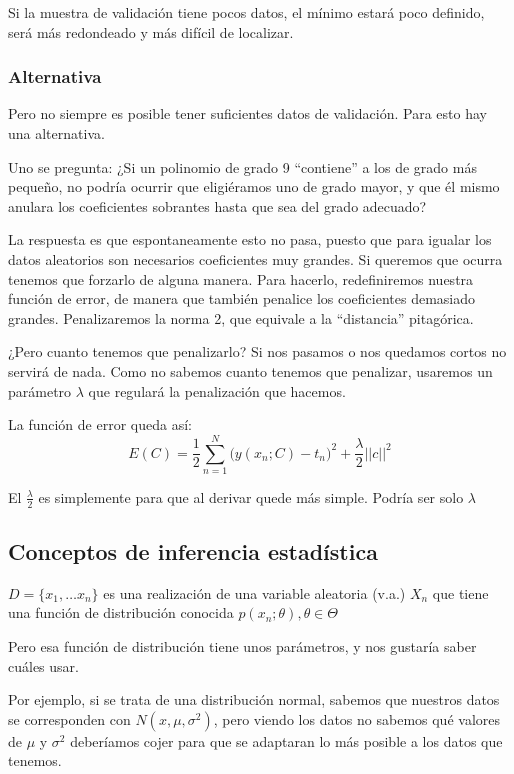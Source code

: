 \documentclass[a4paper,10pt]{article}
\begin{document}
Si la muestra de validación tiene pocos datos, el mínimo estará poco definido, será más redondeado y más difícil de localizar.

\subsubsection*{Alternativa}
Pero no siempre es posible tener suficientes datos de validación. Para esto hay una alternativa.

Uno se pregunta: ¿Si un polinomio de grado 9 ``contiene'' a los de grado más pequeño, no podría ocurrir que eligiéramos uno de grado mayor, y que él mismo anulara los coeficientes sobrantes hasta que sea del grado adecuado?

La respuesta es que espontaneamente esto no pasa, puesto que para igualar los datos aleatorios son necesarios coeficientes muy grandes. Si queremos que ocurra tenemos que forzarlo de alguna manera. Para hacerlo, redefiniremos nuestra función de error, de manera que también penalice los coeficientes demasiado grandes. Penalizaremos la norma 2, que equivale a la ``distancia'' pitagórica.

¿Pero cuanto tenemos que penalizarlo? Si nos pasamos o nos quedamos cortos no servirá de nada. Como no sabemos cuanto tenemos que penalizar, usaremos un parámetro $\lambda$ que regulará la penalización que hacemos.

La función de error queda así:
\begin{equation*}
E(C) = \frac{1}{2} \sum_{n = 1}^{N} \Big( y(x_n;C) - t_n\Big)^2 + \frac{\lambda}{2}||c||^2
\end{equation*}

El $\frac{\lambda}{2}$ es simplemente para que al derivar quede más simple. Podría ser solo $\lambda$

\subsection{Conceptos de inferencia estadística}

$D = \{x_1, \dots x_n\}$ es una realización de una variable aleatoria (v.a.) $X_n$ que tiene una función de distribución conocida $p(x_n;\theta), \theta \in \Theta$

Pero esa función de distribución tiene unos parámetros, y nos gustaría saber cuáles usar.

Por ejemplo, si se trata de una distribución normal, sabemos que nuestros datos se corresponden con $N(x, \mu, \sigma^2)$, pero viendo los datos no sabemos qué valores de $\mu$ y $\sigma^2$ deberíamos cojer para que se adaptaran lo más posible a los datos que tenemos.
\end{document}
